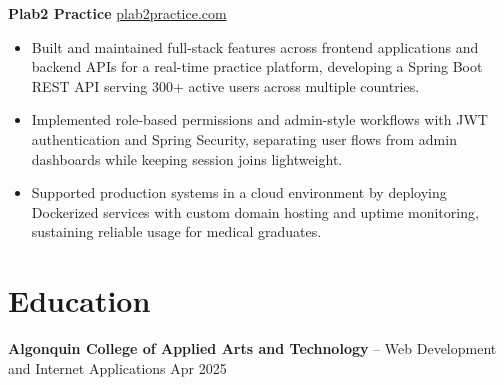 \documentclass[11pt]{article}       %
\begin{document}
\textbf{Plab2 Practice} \hfill \href{https://plab2practice.com}{plab2practice.com} \\
\vspace{-9pt}
\begin{itemize}
  \item Built and maintained full-stack features across frontend applications and backend APIs for a real-time practice platform, developing a Spring Boot REST API serving 300+ active users across multiple countries.
  \item Implemented role-based permissions and admin-style workflows with JWT authentication and Spring Security, separating user flows from admin dashboards while keeping session joins lightweight.
  \item Supported production systems in a cloud environment by deploying Dockerized services with custom domain hosting and uptime monitoring, sustaining reliable usage for medical graduates.
\end{itemize}





\section*{Education}
\textbf{Algonquin College of Applied Arts and Technology} -- Web Development and Internet Applications
\hfill Apr 2025 \\
\end{document}
